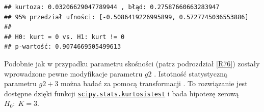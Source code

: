 \documentclass[polish,]{book}
\newenvironment{Shaded}{\begin{snugshade}}{\end{snugshade}}
\newcommand{\BuiltInTok}[1]{#1}
\newcommand{\CharTok}[1]{\textcolor[rgb]{0.31,0.60,0.02}{#1}}
\newcommand{\ControlFlowTok}[1]{\textcolor[rgb]{0.13,0.29,0.53}{\textbf{#1}}}
\newcommand{\DecValTok}[1]{\textcolor[rgb]{0.00,0.00,0.81}{#1}}
\newcommand{\FloatTok}[1]{\textcolor[rgb]{0.00,0.00,0.81}{#1}}
\newcommand{\ImportTok}[1]{#1}
\newcommand{\KeywordTok}[1]{\textcolor[rgb]{0.13,0.29,0.53}{\textbf{#1}}}
\newcommand{\NormalTok}[1]{#1}
\newcommand{\OperatorTok}[1]{\textcolor[rgb]{0.81,0.36,0.00}{\textbf{#1}}}
\newcommand{\StringTok}[1]{\textcolor[rgb]{0.31,0.60,0.02}{#1}}
\begin{document}
\begin{Shaded}
\end{Shaded}

\begin{verbatim}
## kurtoza: 0.03206629047789944 , błąd: 0.27587660663283947
## 95% przedział ufności: [-0.5086419226995899, 0.5727745036553886]
## 
## H0: kurt = 0 vs. H1: kurt != 0
## p-wartość: 0.9074669505499613
\end{verbatim}

Podobnie jak w przypadku parametru skośności (patrz podrozdział \ref{R76}) zostały wprowadzone pewne modyfikacje parametru \(g2\) \citep{kurt2011}. Istotność statystyczną parametru \(g2+3\) można badać za pomocą transformacji \citep{ansom1983}. To rozwiązanie jest dostępne dzięki funkcji
\href{https://docs.scipy.org/doc/scipy/reference/generated/scipy.stats.kurtosistest.html}{\texttt{scipy.stats.kurtosistest}} i bada hipotezę zerową \(H_0:\;K= 3\).
\end{document}
